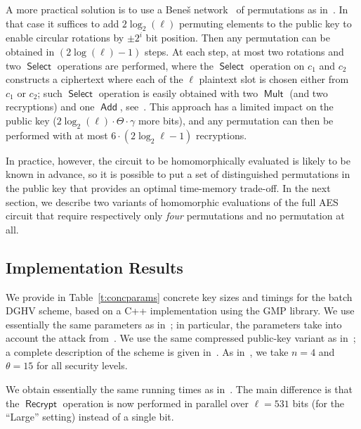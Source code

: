 \documentclass{llncs}
\DeclareMathOperator{\Recrypt}{\ensuremath{\mathsf{Recrypt}}}
\DeclareMathOperator{\Add}{\ensuremath{\mathsf{Add}}}
\DeclareMathOperator{\Mult}{\ensuremath{\mathsf{Mult}}}
\DeclareMathOperator{\Select}{\ensuremath{\mathsf{Select}}}
\newcommand\ignore[1]{}
\begin{document}
A more practical solution is to use a Bene\v{s} network~\cite{Ben1964} of
permutations as in~\cite{GHS2012a}. In that case it suffices to add
$2\log_2(\ell)$ permuting elements to the public key to enable circular
rotations by $\pm 2^i$ bit position. Then any permutation can be obtained
in $(2\log(\ell)-1)$ steps. At each step, at most two rotations and two
$\Select$ operations are performed, where the $\Select$ operation on
$c_1$ and $c_2$ constructs a ciphertext where each of the $\ell$
plaintext slot is chosen either from $c_1$ or $c_2$; such $\Select$
operation is easily obtained with two $\Mult$ (and two recryptions)
and one $\Add$, see~\cite{GHS2012a}. This approach has a
limited impact on the public key ($2\log_2(\ell)\cdot \Theta\cdot \gamma$
more bits), and any permutation can then be performed with at most
$6 \cdot (2 \log_2 \ell-1)$ recryptions.

In practice, however, the circuit to be homomorphically evaluated is
likely to be known in advance, so it is possible to put a set of
distinguished permutations in the public key that provides an optimal
time-memory trade-off. In the next section, we describe two variants of
homomorphic evaluations of the full AES circuit that require respectively only
\emph{four} permutations and no permutation
at all.

\subsection{Implementation Results}\label{subsec:practical-implementation}

We provide  in Table~\ref{t:concparams} concrete key sizes and timings
for the batch DGHV scheme\ignore{ of Section~\ref{sec:batch-error-free}}, 
based on a C++ implementation using the GMP
library. We use essentially the same parameters as
in~\cite{CNT2012,FHEGITHUB}; in particular, the parameters take into
account the attack from~\cite{CN2012}. We use the same compressed
public-key variant as in~\cite{CNT2012}; a complete
description of the scheme is given in~\cite{CLT2013a}.   As
in~\cite{CMNT2011,CNT2012}, we take $n=4$ and $\theta=15$ for all
security levels. 

We obtain essentially the same running times as in~\cite{CNT2012}. The
main difference is that the $\Recrypt$ operation is now performed in
parallel over $\ell=531$ bits (for the ``Large'' setting) instead of a
single bit. 
\end{document}
